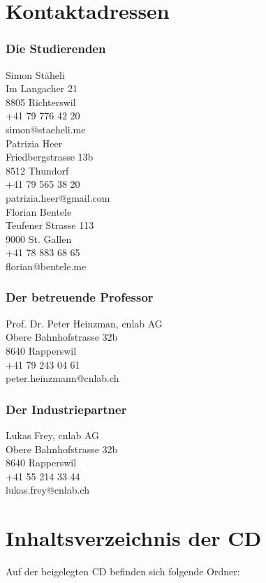 \section{Kontaktadressen}
\subsubsection{Die Studierenden}

Simon Stäheli\\
Im Langacher 21\\
8805 Richterswil\\
+41 79 776 42 20\\
simon@staeheli.me\\

Patrizia Heer\\
Friedbergstrasse 13b\\
8512 Thundorf\\
+41 79 565 38 20\\
patrizia.heer@gmail.com\\

Florian Bentele\\
Teufener Strasse 113\\
9000 St. Gallen\\
+41 78 883 68 65\\
florian@bentele.me

\subsubsection{Der betreuende Professor}
Prof. Dr. Peter Heinzman, cnlab AG\\
Obere Bahnhofstrasse 32b\\
8640 Rapperswil\\
+41 79 243 04 61\\
peter.heinzmann@cnlab.ch

\subsubsection{Der Industriepartner}
Lukas Frey, cnlab AG\\
Obere Bahnhofstrasse 32b\\
8640 Rapperswil\\
+41 55 214 33 44\\
lukas.frey@cnlab.ch

\section{Inhaltsverzeichnis der CD}
Auf der beigelegten CD befinden sich folgende Ordner:
%


